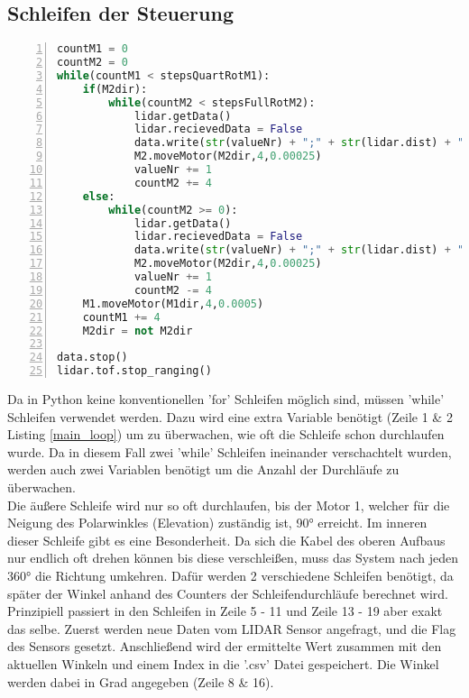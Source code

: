 \subsection{Schleifen der Steuerung}
\begin{lstlisting}[caption={Messen und Aufzeichnen der Entfernungen}, language={Python}, label={main_loop}, numbers=left]
countM1 = 0
countM2 = 0
while(countM1 < stepsQuartRotM1):
    if(M2dir):
        while(countM2 < stepsFullRotM2):
            lidar.getData()
            lidar.recievedData = False
            data.write(str(valueNr) + ";" + str(lidar.dist) + ";" + str(360.0*countM2/stepsFullRotM2) + ";" + str(90.0*countM1/stepsQuartRotM1) + "\n")
            M2.moveMotor(M2dir,4,0.00025)
            valueNr += 1
            countM2 += 4
    else:
        while(countM2 >= 0):
            lidar.getData()
            lidar.recievedData = False
            data.write(str(valueNr) + ";" + str(lidar.dist) + ";" + str(360.0*countM2/stepsFullRotM2) + ";" + str(90.0*countM1/stepsQuartRotM1) + "\n")
            M2.moveMotor(M2dir,4,0.00025)
            valueNr += 1
            countM2 -= 4
    M1.moveMotor(M1dir,4,0.0005)
    countM1 += 4
    M2dir = not M2dir

data.stop()
lidar.tof.stop_ranging()
\end{lstlisting}
Da in Python keine konventionellen 'for' Schleifen möglich sind, müssen 'while' Schleifen verwendet werden. Dazu wird eine extra Variable benötigt (Zeile 1 \& 2 Listing \ref{main_loop}) um zu überwachen, wie oft die Schleife schon durchlaufen wurde. Da in diesem Fall zwei 'while' Schleifen ineinander verschachtelt wurden, werden auch zwei Variablen benötigt um die Anzahl der Durchläufe zu überwachen. \\
Die äußere Schleife wird nur so oft durchlaufen, bis der Motor 1, welcher für die Neigung des Polarwinkles (Elevation) zuständig ist, 90° erreicht. Im inneren dieser Schleife gibt es eine Besonderheit. Da sich die Kabel des oberen Aufbaus nur endlich oft drehen können bis diese verschleißen, muss das System nach jeden 360° die Richtung umkehren. Dafür werden 2 verschiedene Schleifen benötigt, da später der Winkel anhand des Counters der Schleifendurchläufe berechnet wird. Prinzipiell passiert in den Schleifen in Zeile 5 - 11 und Zeile 13 - 19 aber exakt das selbe. Zuerst werden neue Daten vom \ac{LIDAR} Sensor angefragt, und die Flag des Sensors gesetzt. Anschließend wird der ermittelte Wert zusammen mit den aktuellen Winkeln und einem Index in die '.csv' Datei gespeichert. Die Winkel werden dabei in Grad angegeben (Zeile 8 \& 16).\\
